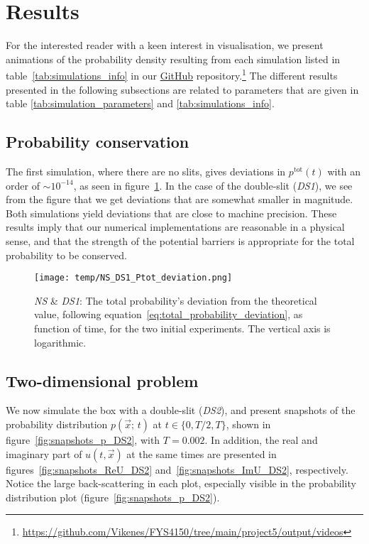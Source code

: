 \section{Results}\label{sec:results}

For the interested reader with a keen interest in visualisation, we present animations of the probability density resulting from each simulation listed in table~\ref{tab:simulations_info} in our \href{\animlink}{GitHub} repository.\footnote{\url{https://github.com/Vikenes/FYS4150/tree/main/project5/output/videos}} The different results presented in the following subsections are related to parameters that are given in table \ref{tab:simulation_parameters} and \ref{tab:simulations_info}.   

\subsection{Probability conservation}\label{sec:results:sanity}

    The first simulation, where there are no slits, gives deviations in $p^\mathrm{tot}(t)$ with an order of $\sim 10^{-14}$, as seen in figure~\ref{fig:ptot_deviation_NS_DS1}. In the case of the double-slit (\textit{DS1}), we see from the figure that we get deviations that are somewhat smaller in magnitude. Both simulations yield deviations that are close to machine precision. These results imply that our numerical implementations are reasonable in a physical sense, and that the strength of the potential barriers is appropriate for the total probability to be conserved.   
 
    \begin{figure}[ht!]
        \centering
        \texttt{[image: temp/NS\_DS1\_Ptot\_deviation.png]}
        \caption{\textit{NS} \& \textit{DS1}: The total probability's deviation from the theoretical value, following equation~\eqref{eq:total_probability_deviation}, as function of time, for the two initial experiments. The vertical axis is logarithmic.}
        \label{fig:ptot_deviation_NS_DS1}
    \end{figure}


\subsection{Two-dimensional problem}
    
    We now simulate the box with a double-slit (\textit{DS2}), and present snapshots of the probability distribution $p(\vec{x};\, t)$ at $t\in\{0,T/2,T\}$, shown in figure~\ref{fig:snapshots_p_DS2}, with $T=0.002$. In addition, the real and imaginary part of $u(t, \vec{x})$ at the same times are presented in figures~\ref{fig:snapshots_ReU_DS2} and~\ref{fig:snapshots_ImU_DS2}, respectively. Notice the large back-scattering in each plot, especially visible in the probability distribution plot (figure~\ref{fig:snapshots_p_DS2}).

